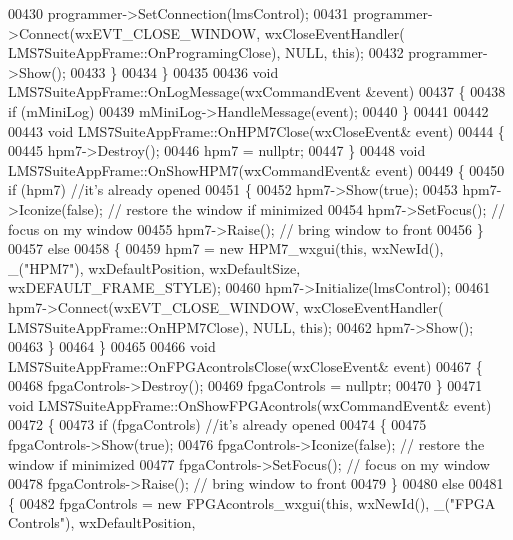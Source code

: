 \begin{DoxyCode}
{{{{00430         programmer->SetConnection(lmsControl);
00431         programmer->Connect(wxEVT\_CLOSE\_WINDOW, wxCloseEventHandler(
      LMS7SuiteAppFrame::OnProgramingClose), NULL, \textcolor{keyword}{this});
00432         programmer->Show();
00433     \}
00434 \}
00435 
00436 \textcolor{keywordtype}{void} LMS7SuiteAppFrame::OnLogMessage(wxCommandEvent &event)
00437 \{
00438     \textcolor{keywordflow}{if} (mMiniLog)
00439         mMiniLog->HandleMessage(event);
00440 \}
00441 
00442 
00443 \textcolor{keywordtype}{void} LMS7SuiteAppFrame::OnHPM7Close(wxCloseEvent& event)
00444 \{
00445     hpm7->Destroy();
00446     hpm7 = \textcolor{keyword}{nullptr};
00447 \}
00448 \textcolor{keywordtype}{void} LMS7SuiteAppFrame::OnShowHPM7(wxCommandEvent& event)
00449 \{
00450     \textcolor{keywordflow}{if} (hpm7) \textcolor{comment}{//it's already opened}
00451     \{
00452         hpm7->Show(\textcolor{keyword}{true});
00453         hpm7->Iconize(\textcolor{keyword}{false}); \textcolor{comment}{// restore the window if minimized}
00454         hpm7->SetFocus();  \textcolor{comment}{// focus on my window}
00455         hpm7->Raise();  \textcolor{comment}{// bring window to front}
00456     \}
00457     \textcolor{keywordflow}{else}
00458     \{
00459         hpm7 = \textcolor{keyword}{new} HPM7_wxgui(\textcolor{keyword}{this}, wxNewId(), \_(\textcolor{stringliteral}{"HPM7"}), wxDefaultPosition, wxDefaultSize, 
      wxDEFAULT\_FRAME\_STYLE);
00460         hpm7->Initialize(lmsControl);
00461         hpm7->Connect(wxEVT\_CLOSE\_WINDOW, wxCloseEventHandler(
      LMS7SuiteAppFrame::OnHPM7Close), NULL, \textcolor{keyword}{this});
00462         hpm7->Show();
00463     \}
00464 \}
00465 
00466 \textcolor{keywordtype}{void} LMS7SuiteAppFrame::OnFPGAcontrolsClose(wxCloseEvent& event)
00467 \{
00468     fpgaControls->Destroy();
00469     fpgaControls = \textcolor{keyword}{nullptr};
00470 \}
00471 \textcolor{keywordtype}{void} LMS7SuiteAppFrame::OnShowFPGAcontrols(wxCommandEvent& event)
00472 \{
00473     \textcolor{keywordflow}{if} (fpgaControls) \textcolor{comment}{//it's already opened}
00474     \{
00475         fpgaControls->Show(\textcolor{keyword}{true});
00476         fpgaControls->Iconize(\textcolor{keyword}{false}); \textcolor{comment}{// restore the window if minimized}
00477         fpgaControls->SetFocus();  \textcolor{comment}{// focus on my window}
00478         fpgaControls->Raise();  \textcolor{comment}{// bring window to front}
00479     \}
00480     \textcolor{keywordflow}{else}
00481     \{
00482         fpgaControls = \textcolor{keyword}{new} FPGAcontrols_wxgui(\textcolor{keyword}{this}, wxNewId(), \_(\textcolor{stringliteral}{"FPGA Controls"}), wxDefaultPosition, 
}}}}
\end{DoxyCode}
